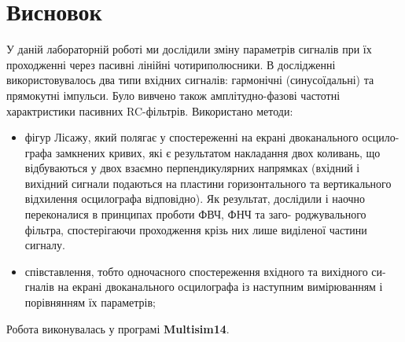 \documentclass[
  ukrainian,
  14pt
]{extreport}
\begin{document}
\section{Висновок}
У даній лабораторній роботі ми дослідили зміну
параметрів сигналів при їх проходженні через пасивні лінійні чотириполюсники. В дослідженні використовувалось два типи вхідних сигналів: гармонічні
(синусоїдальні) та прямокутні імпульси. Було вивчено також амплітудно-фазові
частотні характристики пасивних RC-фільтрів. Використано методи:
\begin{itemize}
  \item фігур Лісажу, який полягає у спостереженні на екрані двоканального осцило-
  графа замкнених кривих, які є результатом накладання двох коливань, що відбуваються
  у двох взаємно перпендикулярних напрямках (вхідний і вихідний сигнали подаються на
  пластини горизонтального та вертикального відхилення осцилографа відповідно). Як
  результат, дослідили і наочно переконалися в принципах проботи ФВЧ, ФНЧ та заго-
  роджувального фільтра, спостерігаючи проходження крізь них лише виділеної частини
  сигналу.
  \item співставлення, тобто одночасного спостереження вхідного та вихідного си-
  гналів на екрані двоканального осцилографа із наступним вимірюванням і порівнянням
  їх параметрів;
\end{itemize}

Робота виконувалась у програмі \textbf{Multisim14}.
\end{document}
